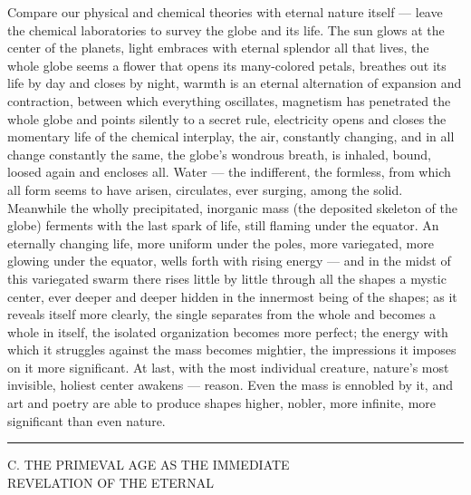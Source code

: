 \documentclass[12pt,a4paper,openany]{book}
\newcommand{\opage}[1]{\marginnote{\footnotesize\textit{[#1]}}}
\newcommand{\excerpthead}[1]{\par\bigskip\begin{center}#1\end{center}\nopagebreak\smallskip}
\newcommand{\sectionrule}{\par\begin{center}\rule{4em}{0.4pt}\end{center}}
\begin{document}
Compare our physical and chemical theories with eternal nature itself --- leave the
chemical laboratories to survey the globe and its life. The sun glows at the center
of the planets, light embraces with eternal splendor all that lives, the whole globe
seems a flower that opens its many-colored petals, breathes out its life by day and
closes by night, warmth is an eternal alternation of expansion and contraction,
between which everything oscillates, magnetism has penetrated the whole globe and
points silently to a secret rule, electricity opens and closes the momentary life of
the chemical interplay, the air, constantly changing, and in all change constantly
the same, the globe's wondrous breath, is inhaled, bound, loosed again and encloses
all.
\setcounter{footnote}{0}%
\opage{51}Water --- the indifferent, the formless, from which all form seems to have
arisen, circulates, ever surging, among the solid. Meanwhile the wholly
precipitated, inorganic mass (the deposited skeleton of the globe) ferments with the
last spark of life, still flaming under the equator. An eternally changing life, more
uniform under the poles, more variegated, more glowing under the equator, wells
forth with rising energy --- and in the midst of this variegated swarm there rises
little by little through all the shapes a mystic center, ever deeper and deeper
hidden in the innermost being of the shapes; as it reveals itself more clearly, the
single separates from the whole and becomes a whole in itself, the isolated
organization becomes more perfect; the energy with which it struggles against the
mass becomes mightier, the impressions it imposes on it more significant. At last,
with the most individual creature, nature's most invisible, holiest center awakens
--- reason. Even the mass is ennobled by it, and art and poetry are able to produce
shapes higher, nobler, more infinite, more significant than even nature.

\sectionrule

\excerpthead{C. THE PRIMEVAL AGE AS THE IMMEDIATE \\ REVELATION OF THE ETERNAL}
\end{document}
